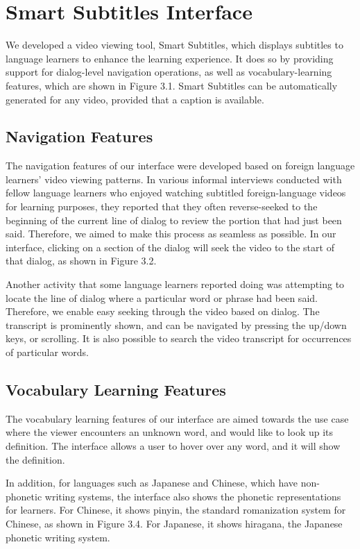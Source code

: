 \documentclass{sigchi}
\begin{document}
\section{Smart Subtitles Interface}

We developed a video viewing tool, Smart Subtitles, which displays subtitles to language learners to enhance the learning experience. It does so by providing support for dialog-level navigation operations, as well as vocabulary-learning features, which are shown in Figure 3.1. Smart Subtitles can be automatically generated for any video, provided that a caption is available.

\subsection{Navigation Features}

The navigation features of our interface were developed based on foreign language learners' video viewing patterns. In various informal interviews conducted with fellow language learners who enjoyed watching subtitled foreign-language videos for learning purposes, they reported that they often reverse-seeked to the beginning of the current line of dialog to review the portion that had just been said. Therefore, we aimed to make this process as seamless as possible. In our interface, clicking on a section of the dialog will seek the video to the start of that dialog, as shown in Figure 3.2.

Another activity that some language learners reported doing was attempting to locate the line of dialog where a particular word or phrase had been said. Therefore, we enable easy seeking through the video based on dialog. The transcript is prominently shown, and can be navigated by pressing the up/down keys, or scrolling. It is also possible to search the video transcript for occurrences of particular words.

\subsection{Vocabulary Learning Features}

The vocabulary learning features of our interface are aimed towards the use case where the viewer encounters an unknown word, and would like to look up its definition. The interface allows a user to hover over any word, and it will show the definition.

In addition, for languages such as Japanese and Chinese, which have non-phonetic writing systems, the interface also shows the phonetic representations for learners. For Chinese, it shows pinyin, the standard romanization system for Chinese, as shown in Figure 3.4. For Japanese, it shows hiragana, the Japanese phonetic writing system.
\end{document}
